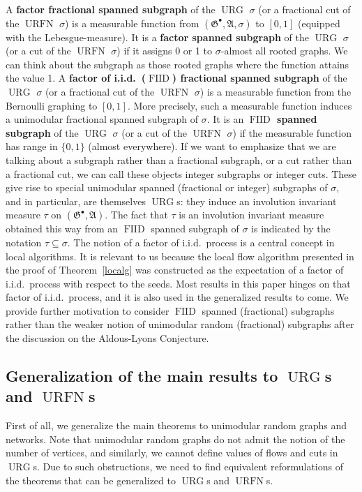 \documentclass[12pt,a4paper]{article}
\renewcommand{\:}{\colon}
\DeclareMathOperator{\URG}{URG}
\DeclareMathOperator{\URN}{URFN}
\DeclareMathOperator{\FIID}{FIID}
\begin{document}
A \textbf{factor fractional spanned subgraph} of the $\URG$ $\sigma$ (or a fractional cut of the $\URN$ $\sigma$) is a measurable function from $(\mathfrak{G}^\bullet, \mathfrak{A}, \sigma)$ to $[0,1]$ (equipped with the Lebesgue-measure). 
It is a \textbf{factor spanned subgraph} of the $\URG$ $\sigma$ (or a cut of the $\URN$ $\sigma$) if it assigns 0 or 1 to $\sigma$-almost all rooted graphs. 
We can think about the subgraph as those rooted graphs where the function attains the value 1. 
A \textbf{factor of i.i.d.\ ($\FIID$) fractional spanned subgraph} of the $\URG$ $\sigma$ (or a fractional cut of the $\URN$ $\sigma$) is a measurable function from the Bernoulli graphing to $[0,1]$. 
More precisely, such a measurable function induces a unimodular fractional spanned subgraph of $\sigma$. 
It is an \textbf{$\FIID$ spanned subgraph} of the $\URG$ $\sigma$ (or a cut of the $\URN$ $\sigma$) if the measurable function has range in $\{0,1\}$ (almost everywhere). 
If we want to emphasize that we are talking about a subgraph rather than a fractional subgraph, or a cut rather than a fractional cut, we can call these objects integer subgraphs or integer cuts. 
These give rise to special unimodular spanned (fractional or integer) subgraphs of $\sigma$, and in particular, are themselves $\URG$s: they induce an involution invariant measure $\tau$ on $(\mathfrak{G}^\bullet, \mathfrak{A})$. 
The fact that $\tau$ is an involution invariant measure obtained this way from an $\FIID$ spanned subgraph of $\sigma$ is indicated by the notation $\tau\subseteq \sigma$.  
The notion of a factor of i.i.d.\ process is a central concept in local algorithms. It is relevant to us because the local flow algorithm presented in the proof of Theorem~\ref{localg} was constructed as the expectation of a factor of i.i.d.\ process with respect to the seeds. 
Most results in this paper hinges on that factor of i.i.d.\ process, and it is also used in the generalized results to come.  
We provide further motivation to consider $\FIID$ spanned (fractional) subgraphs rather than the weaker notion of unimodular random (fractional) subgraphs after the discussion on the Aldous-Lyons Conjecture. 




\subsection{Generalization of the main results to $\URG$s and $\URN$s}



First of all, we generalize the main theorems to unimodular random graphs and networks. 
Note that unimodular random graphs do not admit the notion of the number of vertices, and similarly, we cannot define values of flows and cuts in $\URG$s. 
Due to such obstructions, we need to find equivalent reformulations of the theorems that can be generalized to $\URG$s and $\URN$s. 
\end{document}

